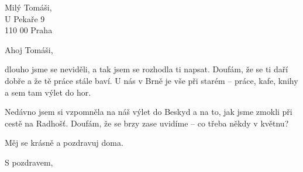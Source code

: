 \documentclass[a4paper,12pt]{letter}
\begin{document}
\begin{letter}{Milý Tomáši, \\ U Pekaře 9 \\ 110 00 Praha}
\opening{Ahoj Tomáši,}

dlouho jsme se neviděli, a tak jsem se rozhodla ti napsat. Doufám, že se ti daří dobře a že tě práce stále baví. U nás v Brně je vše při starém – práce, kafe, knihy a sem tam výlet do hor.

Nedávno jsem si vzpomněla na náš výlet do Beskyd a na to, jak jsme zmokli při cestě na Radhošť. Doufám, že se brzy zase uvidíme – co třeba někdy v květnu?

Měj se krásně a pozdravuj doma.

\closing{S pozdravem,}

\end{letter}
\end{document}
